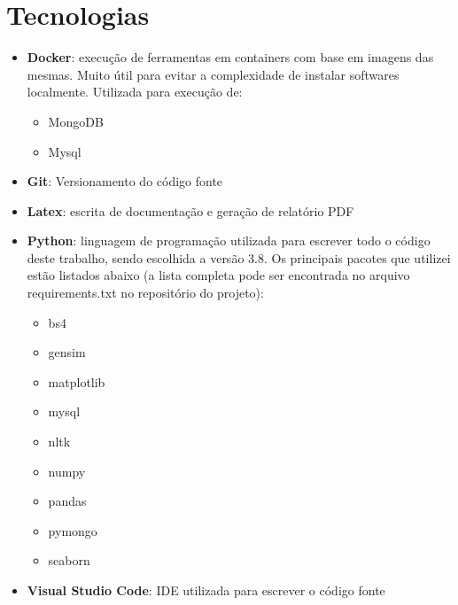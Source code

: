 \section{Tecnologias}

\begin{itemize}
    \item \textbf{Docker}: execução de ferramentas em containers com base em imagens das mesmas. Muito útil para evitar a complexidade de instalar softwares 
    localmente. Utilizada para execução de:
        \begin{itemize}
            \item MongoDB
            \item Mysql
        \end{itemize}
    \item \textbf{Git}: Versionamento do código fonte
    \item \textbf{Latex}: escrita de documentação e geração de relatório PDF
    \item \textbf{Python}: linguagem de programação utilizada para escrever todo o código deste trabalho, sendo escolhida a versão 3.8. Os principais pacotes que 
    utilizei estão listados abaixo (a lista completa pode ser encontrada no arquivo requirements.txt no repositório do projeto):
        \begin{itemize}
            \item bs4
            \item gensim
            \item matplotlib
            \item mysql
            \item nltk
            \item numpy
            \item pandas
            \item pymongo
            \item seaborn
        \end{itemize}
    \item \textbf{Visual Studio Code}: IDE utilizada para escrever o código fonte 
\end{itemize}